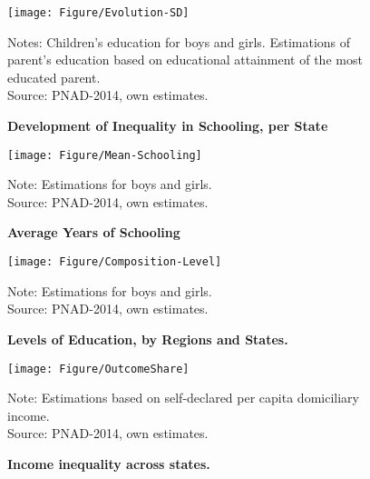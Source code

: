 \documentclass[a4paper, 12pt]{article}
\begin{document}
\begin{figure}[H]
\centering
   \texttt{[image: Figure/Evolution-SD]}
    \label{fig:Evolution-SD}
\begin{minipage}{0.8\textwidth} %
{\scriptsize
Notes: Children's education for boys and girls. Estimations of parent's education based on educational attainment of the most educated parent.\\ Source: PNAD-2014, own estimates.\par}
\end{minipage}
\captionsetup{justification=centering,margin=1cm}
\caption{\textbf{Development of Inequality in Schooling, per State}}
\end{figure}





\begin{figure}[H]
\centering
\texttt{[image: Figure/Mean-Schooling]}
\label{fig:Mean-Schooling}
\begin{minipage}{0.88\textwidth} %
{\scriptsize
Note: Estimations for boys and girls. \\
Source: PNAD-2014, own estimates.\par}
\end{minipage}
\captionsetup{justification=centering,margin=2cm}
\caption{\textbf{Average Years of Schooling}}
\end{figure}

\vspace{20pt}


\begin{figure}[htb]
\centering
\texttt{[image: Figure/Composition-Level]}
\label{fig:Composition-Level}
\begin{minipage}{0.88\textwidth} %
{\scriptsize
Note: Estimations for boys and girls. \\
Source: PNAD-2014, own estimates.\par}
\end{minipage}
\captionsetup{justification=centering,margin=2cm}
\caption{\textbf{Levels of Education, by Regions and States.}}
\end{figure}




\begin{figure}[htb]
\centering
      \texttt{[image: Figure/OutcomeShare]}
     \label{fig:OutcomeShare}
     \begin{minipage}{0.9\textwidth} %
{\scriptsize
Note: Estimations based on self-declared per capita domiciliary income. \\
Source: PNAD-2014, own estimates.\par}
\end{minipage}
\captionsetup{justification=centering,margin=2cm}
\caption{\textbf{Income inequality across states.}}
\end{figure}   
\end{document}
